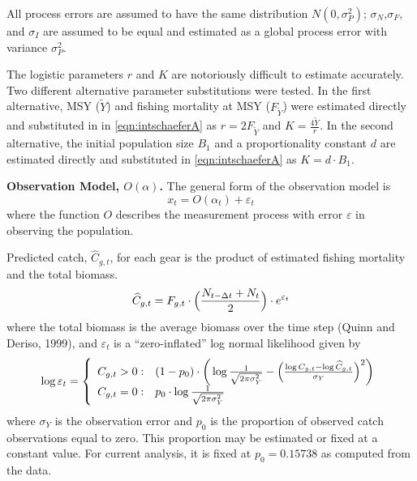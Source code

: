 \documentclass[12pt,letterpaper,twoside]{article}
\newcommand\MSY{\tilde{Y}}
\newcommand\Fmsy{F_{\MSY}}
\begin{document}
All process errors are assumed to have the same distribution
$N(0,\sigma^2_P)$; $\sigma_N$,$\sigma_F$, and $\sigma_I$ are assumed
to be equal and estimated as a global process error with variance
$\sigma^2_P$.

The logistic parameters $r$ and $K$ are notoriously difficult to estimate
accurately. Two different
alternative parameter substitutions were tested. In the first
alternative, MSY ($\MSY$) and fishing mortality at MSY ($\Fmsy$) were
estimated directly and substituted in in \ref{eqn:intschaeferA} as
$r=2F_{\MSY}$ and $K=\frac{4\MSY}{r}$.
In the second alternative, the initial population size $B_1$ and a
proportionality constant $d$ are estimated directly and substituted in
\ref{eqn:intschaeferA} as $K=d\cdot B_1$.


{\bf Observation Model, $O(\alpha)$.}
The general form of the observation model is
\begin{equation}
x_t = O(\alpha_t) + \varepsilon_t
\end{equation}
where the function $O$ describes the measurement process with
error $\varepsilon$ in observing the population.

Predicted catch, $\widehat{C}_{g,t}$, for each gear is the product of
estimated fishing mortality and the total biomass.
\begin{equation}
\widehat{C}_{g,t} = F_{g,t}\cdot\Bigl(\frac{N_{t-\Delta
t}+N_t}{2}\Bigr) \cdot e^{\varepsilon_t}
\label{eqn:obs1}
\end{equation}
where the total biomass is  the average
biomass over the time step (Quinn and Deriso, 1999), and
$\varepsilon_t$ is a ``zero-inflated'' log normal likelihood given by
\begin{equation}
  \log \varepsilon_t = \left\{
    \begin{array}{r@{\;:\quad}l}
       C_{g,t} > 0 &
(1-p_0)\cdot\bigg(\log\frac{1}{\sqrt{2\pi\sigma^2_Y}}
          -\Bigl(\frac{\log
C_{g,t}-\log\widehat{C}_{g,t}}{\sigma_Y}\Bigr)^2\bigg)\\
       C_{g,t} = 0 & p_0 \cdot\log \frac{1}{\sqrt{2\pi\sigma^2_Y}}\\
    \end{array}
  \right.
\end{equation}
where $\sigma_Y$ is the observation error and
$p_0$ is the proportion of observed catch observations equal to zero.
This proportion may be estimated or fixed at a constant value. For
current analysis, it is fixed at $p_0 = 0.15738$ as computed from the data.
\end{document}
